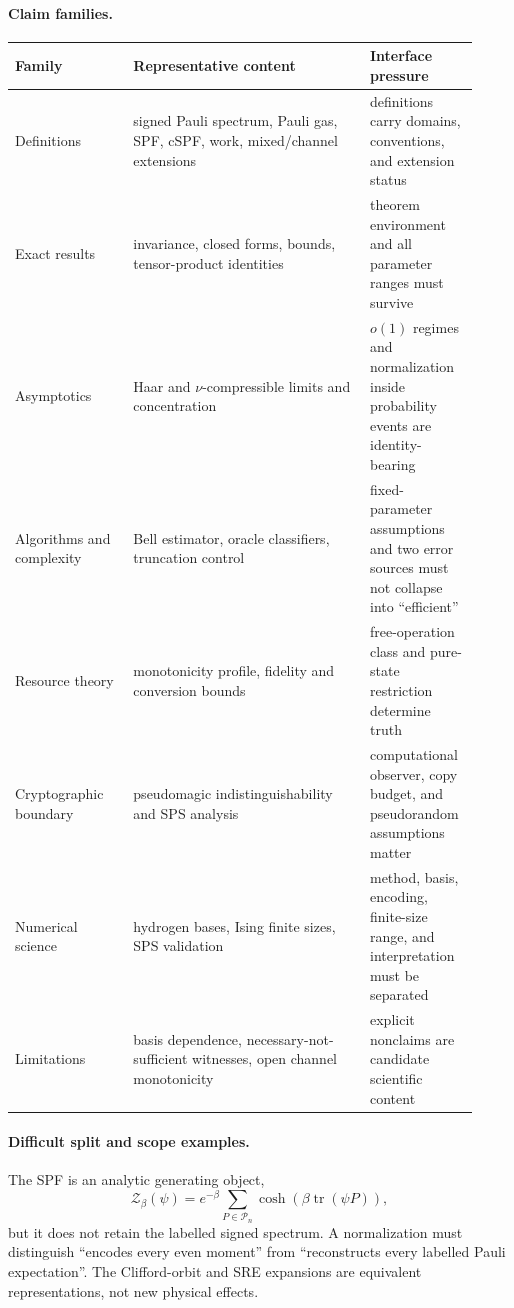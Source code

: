 \paragraph{Claim families.}
\begin{center}
\begin{tabular}{p{0.24\linewidth}p{0.48\linewidth}p{0.20\linewidth}}
\toprule
Family & Representative content & Interface pressure\\
\midrule
Definitions & signed Pauli spectrum, Pauli gas, SPF, cSPF, work, mixed/channel extensions & definitions carry domains, conventions, and extension status\\
Exact results & invariance, closed forms, bounds, tensor-product identities & theorem environment and all parameter ranges must survive\\
Asymptotics & Haar and $\nu$-compressible limits and concentration & $o(1)$ regimes and normalization inside probability events are identity-bearing\\
Algorithms and complexity & Bell estimator, oracle classifiers, truncation control & fixed-parameter assumptions and two error sources must not collapse into ``efficient''\\
Resource theory & monotonicity profile, fidelity and conversion bounds & free-operation class and pure-state restriction determine truth\\
Cryptographic boundary & pseudomagic indistinguishability and SPS analysis & computational observer, copy budget, and pseudorandom assumptions matter\\
Numerical science & hydrogen bases, Ising finite sizes, SPS validation & method, basis, encoding, finite-size range, and interpretation must be separated\\
Limitations & basis dependence, necessary-not-sufficient witnesses, open channel monotonicity & explicit nonclaims are candidate scientific content\\
\bottomrule
\end{tabular}
\end{center}

\paragraph{Difficult split and scope examples.}
The SPF is an analytic generating object,
\[
\mathcal Z_\beta(\psi)=e^{-\beta}\sum_{P\in\mathcal P_n}
\cosh\!\left(\beta\operatorname{tr}(\psi P)\right),
\]
but it does not retain the labelled signed spectrum. A normalization must distinguish ``encodes every even moment'' from ``reconstructs every labelled Pauli expectation''. The Clifford-orbit and SRE expansions are equivalent representations, not new physical effects.

